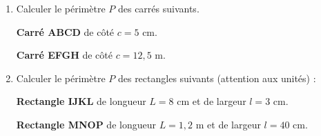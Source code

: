 \documentclass[a4paper]{book}
\begin{document}
        \begin{exemple}
        \begin{enumerate}
            \item Calculer le périmètre $P$ des carrés suivants.

            \begin{minipage}{0.45\linewidth}
                \textbf{Carré ABCD} de côté $c = 5 \text{ cm}$. 

                \medskip
                
            \end{minipage}
            \hfill \vline \hfill
            \begin{minipage}{0.45\linewidth}
                \textbf{Carré EFGH} de côté $c = 12,5 \text{ m}$. 

                \medskip
                
            \end{minipage}
            
            \item Calculer le périmètre $P$ des rectangles suivants (attention aux unités) :

            \begin{minipage}{0.45\linewidth}
                \textbf{Rectangle IJKL} de longueur $L = 8 \text{ cm}$ et de largeur $l = 3 \text{ cm}$. 

                \medskip
                

                \vspace{1.5cm}
            \end{minipage}
            \hfill \vline \hfill
            \begin{minipage}{0.45\linewidth}
                \textbf{Rectangle MNOP} de longueur $L = 1,2 \text{ m}$ et de largeur $l = 40 \text{ cm}$. 


\end{minipage}
\end{enumerate}
\end{exemple}
\end{document}
